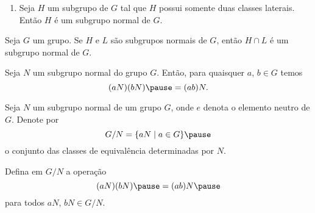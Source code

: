 \documentclass{beamer}
\begin{document}
    \begin{frame}
        \begin{exemplos}
            \begin{enumerate}[label=({\arabic*})]
                \conti

                \item Seja $H$ um subgrupo de $G$ \pause tal que $H$ possui somente duas classes laterais. \pause Então $H$ é um subgrupo normal de $G$.

                \seti
            \end{enumerate}
        \end{exemplos}
    \end{frame}

    \begin{frame}
        \begin{proposicao}
            Seja $G$ um grupo. \pause Se $H$ e $L$ são subgrupos normais de $G$, \pause então $H \cap L$ \pause é um subgrupo normal de $G$.
        \end{proposicao}
    \end{frame}

    \begin{frame}
        \begin{proposicao}
            Seja $N$ um subgrupo normal \pause do grupo $G$. \pause Então, para quaisquer $a$, $b \in G$ temos \pause
            \[
                (aN)(bN) \pause = (ab)N.
            \]
        \end{proposicao}
    \end{frame}

    \begin{frame}
        Seja $N$ um subgrupo normal \pause de um grupo $G$, onde $e$ denota o elemento neutro de $G$. \pause Denote por \pause
        \[
            G/N = \{aN \mid a \in G\} \pause
        \]
        o conjunto das classes de equival\^encia determinadas por $N$. \pause

        \vspace{.5cm}

        Defina em $G/N$ a operação \pause
        \[
            (aN)(bN)  \pause = (ab)N \pause
        \]
        para todos $aN$, $bN \in G/N$.
    \end{frame}
\end{document}
